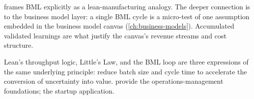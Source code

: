 \textcite{ries2011} frames BML explicitly as a lean-manufacturing analogy. The deeper connection is to the business model layer: a single BML cycle is a micro-test of one assumption embedded in the business model canvas (\cref{ch:business-models}). Accumulated validated learnings are what justify the canvas's revenue streams and cost structure.

Lean's throughput logic, Little's Law, and the BML loop are three expressions of the same underlying principle: reduce batch size and cycle time to accelerate the conversion of uncertainty into value. \textcite{cachon2024matching} provide the operations-management foundations; \textcite{ries2011} the startup application.
